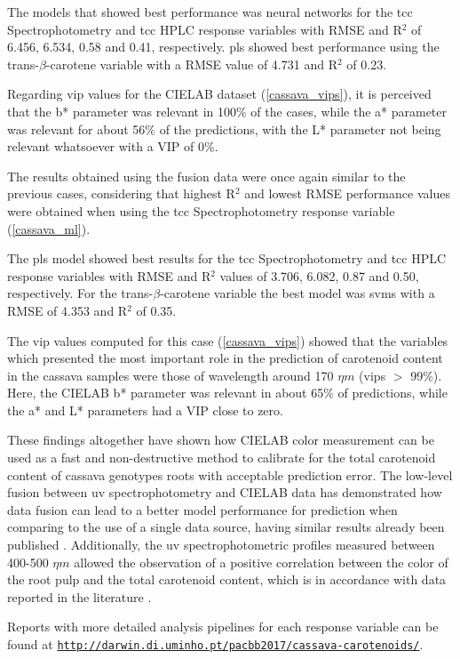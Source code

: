 The models that showed best performance was neural networks for the \gls{tcc} Spectrophotometry and \gls{tcc} HPLC response variables with RMSE and R$^{2}$ of 6.456, 6.534, 0.58 and 0.41, respectively. \gls{pls} showed best performance using the trans-$\beta$-carotene variable with a RMSE value of 4.731 and R$^{2}$ of 0.23.

Regarding \gls{vip} values for the CIELAB dataset (\autoref{cassava_vips}), it is perceived that the b* parameter was relevant in 100\% of the cases, while the a* parameter was relevant for about 56\% of the predictions, with the L* parameter not being relevant whatsoever with a VIP of 0\%. 

The results obtained using the fusion data were once again similar to the previous cases, considering that highest R$^{2}$ and lowest RMSE performance values were obtained when using the \gls{tcc} Spectrophotometry response variable (\autoref{cassava_ml}). 

The \gls{pls} model showed best results for the \gls{tcc} Spectrophotometry and \gls{tcc} HPLC response variables with RMSE and R$^{2}$ values of 3.706, 6.082, 0.87 and 0.50, respectively. For the trans-$\beta$-carotene variable the best model was \gls{svm}s with a RMSE of 4.353 and R$^{2}$ of 0.35.

The \gls{vip} values computed for this case (\autoref{cassava_vips}) showed that the variables which presented the most important role in the prediction of carotenoid content in the cassava samples were those of wavelength around 170 $\eta m$ (\gls{vip}s $ > $ 99\%). Here, the CIELAB b* parameter was relevant in about 65\% of predictions, while the a* and L* parameters had a VIP close to zero.

These findings altogether have shown how CIELAB color measurement can be used as a fast and non-destructive method to calibrate for the total carotenoid content of cassava genotypes roots with acceptable prediction error. The low-level fusion between \gls{uv} spectrophotometry and CIELAB data has demonstrated how data fusion can lead to a better model performance for prediction when comparing to the use of a single data source, having similar results already been published \citep{botwey2014multi}. Additionally, the \gls{uv} spectrophotometric profiles measured between 400-500 $\eta m$ allowed the observation of a positive correlation between the color of the root pulp and the total carotenoid content, which is in accordance with data reported in the literature \citep{champagne2010carotenoid, chavez2005variation, iglesias1997genetic}.

Reports with more detailed analysis pipelines for each response variable can be found at \href{http://darwin.di.uminho.pt/pacbb2017/cassava-carotenoids/}{\nolinkurl{http://darwin.di.uminho.pt/pacbb2017/cassava-carotenoids/}}.








